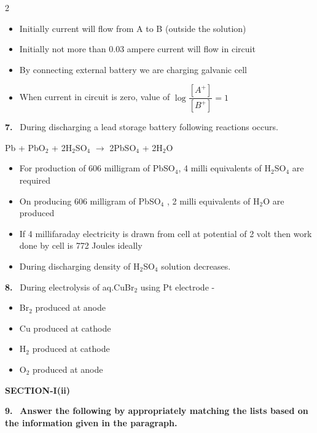 \documentclass[10pt]{extarticle}
\newcommand{\sect}[1]{\par\smallskip\noindent\textbf{#1}\par}
\newcommand{\qn}[1]{\par\smallskip\noindent\textbf{#1.}~}
\newenvironment{qoptions}{\begin{itemize}[leftmargin=1.8em,itemsep=1pt,topsep=2pt,label={}]}{\end{itemize}}
\newcommand{\opt}[2]{\item[(#1)] #2}
\begin{document}
\begin{multicols}{2}
\begin{qoptions}
\opt{A}{Initially current will flow from A to B (outside the solution)}
\opt{B}{Initially not more than 0.03 ampere current will flow in circuit}
\opt{C}{By connecting external battery we are charging galvanic cell}
\opt{D}{When current in circuit is zero, value of $\log\dfrac{[A^+]}{[B^+]}=1$}
\end{qoptions}
\qn{7} During discharging a lead storage battery following reactions occurs.\par
Pb + PbO$_2$ + 2H$_2$SO$_4$ $\to$ 2PbSO$_4$ + 2H$_2$O\par
[Atomic mass : Pb = 207, S = 32]
\begin{qoptions}
\opt{A}{For production of 606 milligram of PbSO$_4$, 4 milli equivalents of H$_2$SO$_4$ are required}
\opt{B}{On producing 606 milligram of PbSO$_4$ , 2 milli equivalents of H$_2$O are produced}
\opt{C}{If 4 millifaraday electricity is drawn from cell at potential of 2 volt then work done by cell is 772 Joules ideally}
\opt{D}{During discharging density of H$_2$SO$_4$ solution decreases.}
\end{qoptions}
\qn{8} During electrolysis of aq.CuBr$_2$ using Pt electrode -
\begin{qoptions}
\opt{A}{Br$_2$ produced at anode}
\opt{B}{Cu produced at cathode}
\opt{C}{H$_2$ produced at cathode}
\opt{D}{O$_2$ produced at anode}
\end{qoptions}
\sect{SECTION-I(ii)}
\qn{9} \textbf{Answer the following by appropriately matching the lists based on the information given in the paragraph.}\par
\smallskip
{}
\end{multicols}
\end{document}
